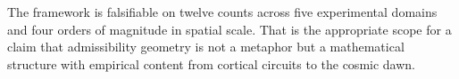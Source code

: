\documentclass[12pt, a4paper, twoside]{book}
\theoremstyle{definition}
\theoremstyle{remark}
\begin{document}
The framework is falsifiable on twelve counts across five experimental domains and four orders of magnitude in spatial scale. That is the appropriate scope for a claim that admissibility geometry is not a metaphor but a mathematical structure with empirical content from cortical circuits to the cosmic dawn.



\backmatter
\cleardoublepage
{}

\end{document}
